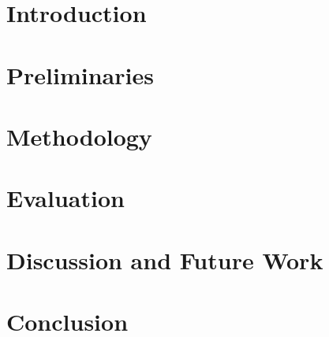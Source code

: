 \documentclass[headsepline,footsepline,footinclude=false,oneside,fontsize=11pt,paper=a4,listof=totoc,bibliography=totoc]{scrbook} %
\begin{document}


\frontmatter{}




\tableofcontents{}

\mainmatter{}
\chapter{Introduction}





\chapter{Preliminaries}




\chapter{Methodology}




\chapter{Evaluation}





\chapter{Discussion and Future Work}
\chapter{Conclusion}

% 
% 
% 
% 
% 

\appendix{}
\printbibliography{}
\end{document}
